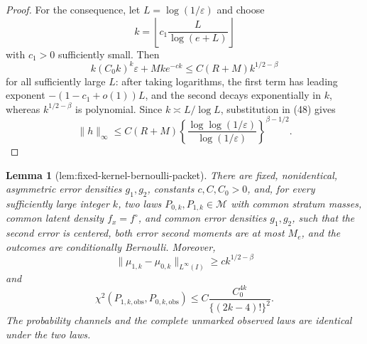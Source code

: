 \documentclass{article}
\newtheorem{lemma}{Lemma}
\begin{document}
\begin{proof}
For the consequence, let \(L=\log(1/\varepsilon)\) and choose
\[
k=\left\lfloor c_1\frac{L}{\log(e+L)}\right\rfloor
\]
with \(c_1>0\) sufficiently small.  Then
\[
k(C_0k)^k\varepsilon+Mk e^{-ck}
\le C(R+M)k^{1/2-\beta}
\]
for all sufficiently large \(L\): after taking logarithms, the first term has leading exponent \(-(1-c_1+o(1))L\), and the second decays exponentially in \(k\), whereas \(k^{1/2-\beta}\) is polynomial.  Since \(k\asymp L/\log L\), substitution in (48) gives
\[
\|h\|_\infty
\le C(R+M)
\left\{\frac{\log\log(1/\varepsilon)}{\log(1/\varepsilon)}\right\}^{\beta-1/2}.
\]
\end{proof}

\begin{lemma}[lem:fixed-kernel-bernoulli-packet]\label{lem:fixed-kernel-bernoulli-packet}
There are fixed, nonidentical, asymmetric error densities \(g_1,g_2\), constants \(c,C,C_0>0\), and, for every sufficiently large integer \(k\), two laws \(P_{0,k},P_{1,k}\in\mathcal M\) with common stratum masses, common latent density \(f_x=f^\circ\), and common error densities \(g_1,g_2\), such that the second error is centered, both error second moments are at most \(M_e\), and the outcomes are conditionally Bernoulli.  Moreover,
\[
 \|\mu_{1,k}-\mu_{0,k}\|_{L^\infty(I)}\ge ck^{1/2-\beta}
\]
and
\[
 \chi^2(P_{1,k,\mathrm{obs}},P_{0,k,\mathrm{obs}})
 \le C\frac{C_0^{4k}}{\{(2k-4)!\}^2}.
\]
The probability channels and the complete unmarked observed laws are identical under the two laws.
\end{lemma}
\end{document}
